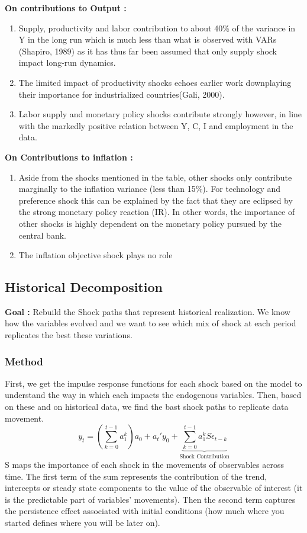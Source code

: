 \documentclass{article}
\begin{document}
\textbf{On contributions to Output  : } 
\begin{enumerate}
    \item Supply, productivity and labor contribution to about 40\% of the variance in Y in the long run which is much less than what is observed with VARs (Shapiro, 1989) as it has thus far been assumed that only supply shock impact long-run dynamics. 
    \item The limited impact of productivity shocks echoes earlier work downplaying their importance for industrialized countries(Gali, 2000).
    \item Labor supply and monetary policy shocks contribute strongly however, in line with the markedly positive relation between Y, C, I and employment in the data. 
\end{enumerate}
\textbf{On Contributions to inflation :}
\begin{enumerate}
    \item Aside from the shocks mentioned in the table, other shocks only contribute marginally to the inflation variance (less than 15\%). For technology and preference shock this can be explained by the fact that they are eclipsed by the strong monetary policy reaction (IR). In other words, the importance of other shocks is highly dependent on the monetary policy pursued by the central bank. 
    \item The inflation objective shock plays no role 
\end{enumerate}

\subsection{Historical Decomposition}

\textbf{Goal :} Rebuild the Shock paths that represent historical realization. We know how the variables evolved and we want to see which mix of shock at each period replicates the best these variations. 
\subsubsection{Method}
First, we get the impulse response functions for each shock based on the model to understand the way in which each impacts  the endogenous variables. Then, based on these and on historical data, we find the bast shock paths to replicate data movement. 
\begin{equation}
    y_t = (\sum_{k=0}^{t-1}a_1^k)a_0 + a_t'y_0+\underbrace{\sum_{k=0}^{t-1}a_1^kS\epsilon_{t-k}}_{\text{Shock Contribution}}
\end{equation}
S maps the importance of each shock in the  movements of observables across time. The first term of the sum represents the contribution of the trend, intercepts or steady state components to the value of the observable of interest (it is the predictable part of variables' movements). Then the second term captures the persistence effect associated with initial conditions (how much where you started defines where you will be later on). 
\end{document}
